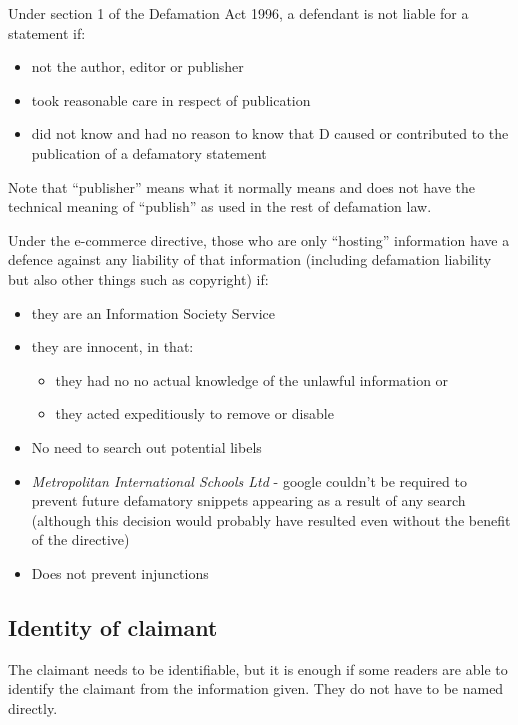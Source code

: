 \documentclass[]{article}
\begin{document}
Under section 1 of the Defamation Act 1996, a defendant is not liable
for a statement if:

\begin{itemize}
\item
  not the author, editor or publisher
\item
  took reasonable care in respect of publication
\item
  did not know and had no reason to know that D caused or contributed to
  the publication of a defamatory statement
\end{itemize}

Note that ``publisher'' means what it normally means and does not have
the technical meaning of ``publish'' as used in the rest of defamation
law.

Under the e-commerce directive, those who are only ``hosting''
information have a defence against any liability of that information
(including defamation liability but also other things such as copyright)
if:

\begin{itemize}
\item
  they are an Information Society Service
\item
  they are innocent, in that:

  \begin{itemize}
  \item
    they had no no actual knowledge of the unlawful information or
  \item
    they acted expeditiously to remove or disable
  \end{itemize}
\item
  No need to search out potential libels
\item
  \emph{{Metropolitan International Schools Ltd}}{ - google couldn't be
  required to prevent future defamatory snippets appearing as a result
  of any search (although this decision would probably have resulted
  even without the benefit of the directive)}
\item
  Does not prevent injunctions
\end{itemize}

\subsection{Identity of claimant}

The claimant needs to be identifiable, but it is enough if some readers
are able to identify the claimant from the information given. They do
not have to be named directly.
\end{document}
